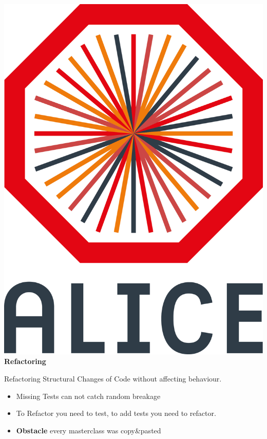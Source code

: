 \documentclass[aspectratio=1610,14pt,dvipsnames]{beamer}
\begin{document}
\begin{frame}{\includegraphics[height=0.07\textheight]{2012-Jul-04-4_Color_Logo_CB.png} \hspace{0.2cm}\textbf{Refactoring}}
  \begin{block}{Refactoring}
    Structural Changes of Code without affecting behaviour.
  \end{block}

  \begin{itemize}
    \item<2> Missing Tests can not catch random breakage
    \item<2> To Refactor you need to test, to add tests you need to refactor.
    \item<2> \textbf{Obstacle} every masterclass was copy\&pasted
  \end{itemize}
\end{frame}
\end{document}
